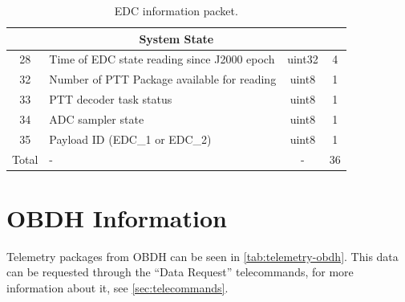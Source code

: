 \begin{table}[!ht]
\begin{tabular}{clcc}
		\midrule                                                                                                         
		\multicolumn{4}{c}{\textbf{System State}}                                                                         \\
		\midrule                                                                                                         
		28                & Time of EDC state reading since J2000 epoch      & uint32            & 4                      \\
		32                & Number of PTT Package available for reading      & uint8             & 1                      \\
		33                & PTT decoder task status                          & uint8             & 1                      \\
		34                & ADC sampler state                                & uint8             & 1                      \\
		35                & Payload ID (EDC\_1 or EDC\_2)                    & uint8             & 1                      \\
		\midrule                                                                                                         
        Total             & -                                                & -                 & 36                     \\
		\bottomrule[1.5pt]
	\end{tabular}
	\caption{EDC information packet.}
	\label{tab:telemetry-edc}
\end{table}

\section{OBDH Information}

Telemetry packages from OBDH can be seen in \autoref{tab:telemetry-obdh}. This data can be requested through the ``Data Request'' telecommands, for more information about it, see \autoref{sec:telecommands}.


